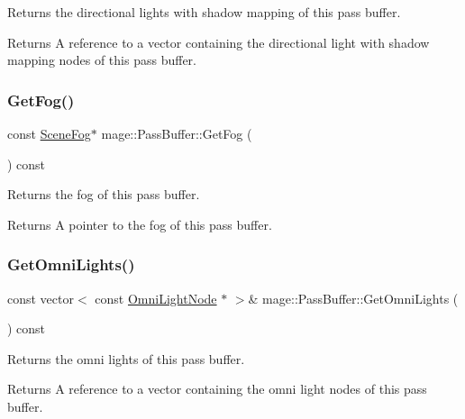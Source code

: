 Returns the directional lights with shadow mapping of this pass buffer.

\begin{DoxyReturn}{Returns}
A reference to a vector containing the directional light with shadow mapping nodes of this pass buffer. 
\end{DoxyReturn}
\hypertarget{structmage_1_1_pass_buffer_a406b7dcb655d3689f0a4400edc2e9bf8}{}\label{structmage_1_1_pass_buffer_a406b7dcb655d3689f0a4400edc2e9bf8} 
\subsubsection{\texorpdfstring{Get\+Fog()}{GetFog()}}
{\footnotesize\ttfamily const \hyperlink{structmage_1_1_scene_fog}{Scene\+Fog}$\ast$ mage\+::\+Pass\+Buffer\+::\+Get\+Fog (\begin{DoxyParamCaption}{ }\end{DoxyParamCaption}) const\hspace{0.3cm}{\ttfamily [noexcept]}}

Returns the fog of this pass buffer.

\begin{DoxyReturn}{Returns}
A pointer to the fog of this pass buffer. 
\end{DoxyReturn}
\hypertarget{structmage_1_1_pass_buffer_a9d085a3784f6e64777b720c8702e2f3e}{}\label{structmage_1_1_pass_buffer_a9d085a3784f6e64777b720c8702e2f3e} 
\subsubsection{\texorpdfstring{Get\+Omni\+Lights()}{GetOmniLights()}}
{\footnotesize\ttfamily const vector$<$ const \hyperlink{namespacemage_a1724c6e6b6b5ba535cdd967cbbb4a669}{Omni\+Light\+Node} $\ast$ $>$\& mage\+::\+Pass\+Buffer\+::\+Get\+Omni\+Lights (\begin{DoxyParamCaption}{ }\end{DoxyParamCaption}) const\hspace{0.3cm}{\ttfamily [noexcept]}}

Returns the omni lights of this pass buffer.

\begin{DoxyReturn}{Returns}
A reference to a vector containing the omni light nodes of this pass buffer. 
\end{DoxyReturn}
\hypertarget{structmage_1_1_pass_buffer_a678adead392b68b985437d3147a6fd38}{}\label{structmage_1_1_pass_buffer_a678adead392b68b985437d3147a6fd38} 
